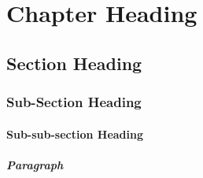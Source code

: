 \documentclass[
		paper=a4,
		12pt,
		twoside=false,
		openright,
	]{scrbook}
\begin{document}

    


	

	\chapter{Chapter Heading}
	\section{Section Heading}
	\subsection{Sub-Section Heading}
	\subsubsection{Sub-sub-section Heading}
	\paragraph{Paragraph}%


    \cleardoublepage


	

	\pagebreak

	

	\cleardoublepage

    
\end{document}
